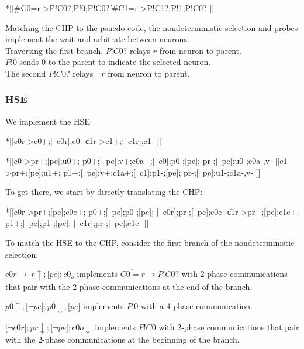 \documentclass{article}
\begin{document}
\begin{csp}
*[[#{C0=r}->P!C0?;P!0;P!C0?
  \|#{C1=r}->P!C1?;P!1;P!C0?
 ]]
\end{csp}

\noindent
Matching the CHP to the psuedo-code, the nondeterministic selection and 
probes implement the wait and arbitrate between neurons. \\
Traversing the first branch, $P!C0?$ relays $r$ from neuron to parent. \\
$P!0$ sends $0$ to the parent to indicate the selected neuron. \\
The second $P!C0?$ relays $\neg r$ from neuron to parent.

\subsubsection*{HSE}

We implement the HSE

\begin{hse}
*[[c0r->c0+;[~c0r];c0-
  \|c1r->c1+;[~c1r];c1-
 ]]

*[[c0->pr+;[pe];u0+;
    p0+;[~pe];v+;c0a+;[~c0];p0-;[pe];
    pr-;[~pe];u0-;c0a-,v-
  []c1->pr+;[pe];u1+;
    p1+;[~pe];v+;c1a+;[~c1];p1-;[pe];
    pr-;[~pe];u1-;c1a-,v-
 ]]
\end{hse}

\noindent
To get there, we start by directly translating the CHP:

\begin{hse}
*[[c0r->pr+;[pe];c0e+;
    p0+;[~pe];p0-;[pe];
    [~c0r];pr-;[~pe];c0e-
  \|c1r->pr+;[pe];c1e+;
    p1+;[~pe];p1-;[pe];
    [~c1r];pr-;[~pe];c1e-
 ]]
\end{hse}

\noindent
To match the HSE to the CHP, consider the first branch of the nondeterministic
selection: 

$c0r\rightarrow\ r\uparrow;\texttt{[}pe\texttt{]};c0_o$ implements 
$\overline{C0=r}\longrightarrow P!C0?$ with 2-phase communications that
pair with the 2-phase communications at the end of the branch.

$p0\uparrow;\texttt{[}\neg pe\texttt{]};p0\downarrow;\texttt{[}pe\texttt{]}$ implements $P!0$ with a 4-phase communication.

$\texttt{[}\neg c0r\texttt{]};pr\downarrow;\texttt{[}\neg pe\texttt{]};c0o\downarrow$ implements $P!C0$ with 2-phase communications that pair with the 
2-phase communications at the beginning of the branch. \\
\end{document}
